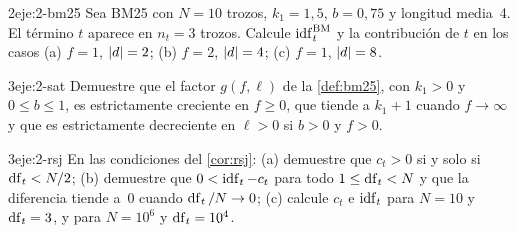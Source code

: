 \begin{ejercicio}{2}{eje:2-bm25}
Sea BM25 con $N=10$ trozos, $k_1=1{,}5$, $b=0{,}75$ y longitud media~4. El término $t$ aparece en $n_t=3$ trozos. Calcule $\operatorname{idf}^{\mathrm{BM}}_t$ y la contribución de $t$ en los casos (a) $f=1$, $\lvert d\rvert=2$; (b) $f=2$, $\lvert d\rvert=4$; (c) $f=1$, $\lvert d\rvert=8$.
\end{ejercicio}

\begin{ejercicio}{3}{eje:2-sat}
Demuestre que el factor $g(f,\ell)$ de la \cref{def:bm25}, con $k_1>0$ y $0\le b\le 1$, es estrictamente creciente en $f\ge 0$, que tiende a $k_1+1$ cuando $f\to\infty$ y que es estrictamente decreciente en $\ell>0$ si $b>0$ y $f>0$.
\end{ejercicio}

\begin{ejercicio}{3}{eje:2-rsj}
En las condiciones del \cref{cor:rsj}: (a) demuestre que $c_t>0$ si y solo si $\operatorname{df}_t<N/2$; (b) demuestre que $0<\operatorname{idf}_t-c_t$ para todo $1\le\operatorname{df}_t<N$ y que la diferencia tiende a~0 cuando $\operatorname{df}_t/N\to 0$; (c) calcule $c_t$ e $\operatorname{idf}_t$ para $N=10$ y $\operatorname{df}_t=3$, y para $N=10^{6}$ y $\operatorname{df}_t=10^{4}$.
\end{ejercicio}
